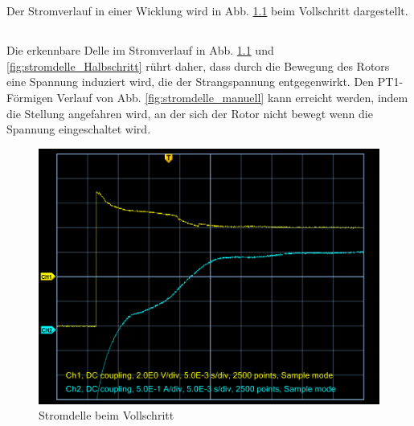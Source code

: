 \chapter{}\label{ex:aufg4}

\section{}\label{sec:aufg4a}
Der Stromverlauf in einer Wicklung wird in Abb. \ref{fig:stromdelle_Vollschritt} beim Vollschritt dargestellt.


\section{}\label{sec:aufg4b}
Die erkennbare Delle im Stromverlauf in Abb. \ref{fig:stromdelle_Vollschritt} und \ref{fig:stromdelle_Halbschritt} rührt daher, dass durch die Bewegung des Rotors eine Spannung induziert wird, die der Strangspannung entgegenwirkt. Den PT1-Förmigen Verlauf von Abb. \ref{fig:stromdelle_manuell} kann erreicht werden, indem die Stellung angefahren wird, an der sich der Rotor nicht bewegt wenn die Spannung eingeschaltet wird.
\begin{figure}[htb]
	\includegraphics[width=\textwidth]{./Bilder/aufg4_Vollschritt_Stromdelle_1}
	\caption{Stromdelle beim Vollschritt}
	\label{fig:stromdelle_Vollschritt}
\end{figure}
